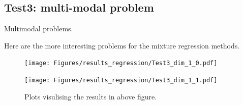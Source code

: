    
    
    





\subsection{Test3: multi-modal problem}
Multimodal problems. 

Here are the more interesting problems for the mixture regression methods. 


\begin{figure}[H]
  \centering
  \begin{minipage}[b]{0.49\textwidth}
   \texttt{[image: Figures/results\_regression/Test3\_dim\_1\_0.pdf]}
  \end{minipage}
  \hfill
  \begin{minipage}[b]{0.49\textwidth}
    \texttt{[image: Figures/results\_regression/Test3\_dim\_1\_1.pdf]}
   \end{minipage}
  \caption{Plots visulising the results in above figure.}
\end{figure}

